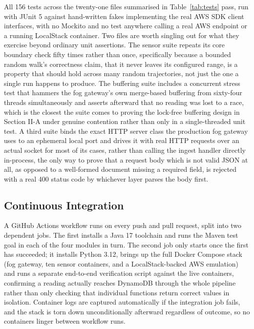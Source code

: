 \documentclass[conference]{IEEEtran}
\begin{document}
All 156 tests across the twenty-one files summarised in Table~\ref{tab:tests} pass, run with JUnit 5 against hand-written fakes implementing the real AWS SDK client interfaces, with no Mockito and no test anywhere calling a real AWS endpoint or a running LocalStack container. Two files are worth singling out for what they exercise beyond ordinary unit assertions. The sensor suite repeats its core boundary check fifty times rather than once, specifically because a bounded random walk's correctness claim, that it never leaves its configured range, is a property that should hold across many random trajectories, not just the one a single run happens to produce. The buffering suite includes a concurrent stress test that hammers the fog gateway's own merge-based buffering from sixty-four threads simultaneously and asserts afterward that no reading was lost to a race, which is the closest the suite comes to proving the lock-free buffering design in Section II-A under genuine contention rather than only in a single-threaded unit test. A third suite binds the exact HTTP server class the production fog gateway uses to an ephemeral local port and drives it with real HTTP requests over an actual socket for most of its cases, rather than calling the ingest handler directly in-process, the only way to prove that a request body which is not valid JSON at all, as opposed to a well-formed document missing a required field, is rejected with a real 400 status code by whichever layer parses the body first.

\subsection{Continuous Integration}

A GitHub Actions workflow runs on every push and pull request, split into two dependent jobs. The first installs a Java 17 toolchain and runs the Maven test goal in each of the four modules in turn. The second job only starts once the first has succeeded; it installs Python 3.12, brings up the full Docker Compose stack (fog gateway, ten sensor containers, and a LocalStack-backed AWS emulation) and runs a separate end-to-end verification script against the live containers, confirming a reading actually reaches DynamoDB through the whole pipeline rather than only checking that individual functions return correct values in isolation. Container logs are captured automatically if the integration job fails, and the stack is torn down unconditionally afterward regardless of outcome, so no containers linger between workflow runs.
\end{document}
